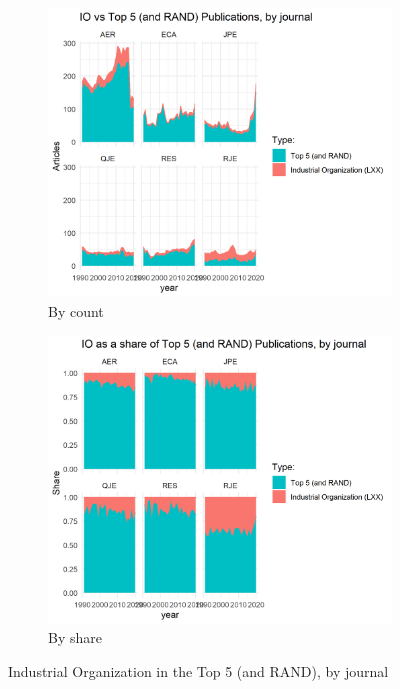 \documentclass[11pt, letterpaper, twoside]{article}
\begin{document}
\begin{figure}[!ht]
    \begin{subfigure}[h]{0.49\textwidth}
        \centering
        \includegraphics[width=\textwidth]{LXX-code-share-area-by-journal.png}
        \caption{By count}
    \end{subfigure}
    \hfill
    \begin{subfigure}[h]{0.49\textwidth}
        \centering
        \includegraphics[width=\textwidth]{LXX-code-share-area-normalized-by-journal.png}
        \caption{By share}
    \end{subfigure}
    \caption{Industrial Organization in the Top 5 (and RAND), by journal}
\end{figure}
\end{document}
